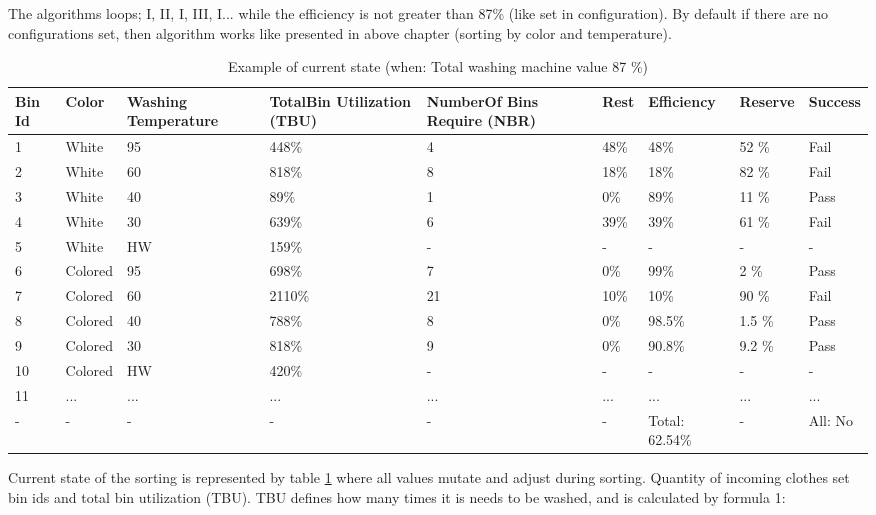 The algorithms loops;  I, II, I, III, I... while the efficiency is not greater than 87\% (like set in configuration). By default if there are no configurations set, then algorithm works like presented in above chapter (sorting by color and temperature).

\begin{table}[h]
	
    \begin{tabular}{ | p{0.4cm} | p{1cm} | p{2cm} | p{1.7cm} |p{2cm} |p{1cm} |p{1.3cm} |p{1.2cm} |p{1.3cm} |}
    \hline
	Bin Id & Color & Washing Temperature & TotalBin Utilization (TBU) & NumberOf Bins Require (NBR) & Rest & Efficiency & Reserve & Success\\ \hline
	1 & White & 95 & 448\% & 4 & 48\% & 48\% & 52 \% & Fail \\ \hline
	2 & White & 60 & 818\% & 8 & 18\% & 18\% & 82 \% & Fail \\ \hline
	3 & White & 40 & 89\% & 1 & 0\% & 89\% & 11 \% & Pass \\ \hline
	4 & White & 30 & 639\% & 6 & 39\% & 39\% & 61 \% & Fail \\ \hline
	5 & White & HW & 159\% & - & - & - & - & - \\ \hline
	6 & Colored & 95 & 698\% & 7 & 0\% & 99\% & 2 \% & Pass \\ \hline
	7 & Colored & 60 & 2110\% & 21 & 10\% & 10\% & 90 \% & Fail \\ \hline
	8 & Colored & 40 & 788\% & 8 & 0\% & 98.5\% & 1.5 \% & Pass \\ \hline
	9 & Colored & 30 & 818\% & 9 & 0\% & 90.8\% & 9.2 \% & Pass \\ \hline
	10 & Colored & HW & 420\% & - & - & - & - & - \\ \hline
	11 & ... & ... & ... & ... & ... & ... & ... & ... \\ \hline
	- & - & - & - & - & - & Total: 62.54\% & - & All: No \\ \hline
    \end{tabular}
	\caption{Example of current state (when: Total washing machine value 87 \%)}
	\label{tab:currentState}
\end{table}

\newpage

Current state of the sorting is represented by table \ref{tab:currentState} where all values mutate and adjust during sorting. Quantity of incoming clothes set bin ids and total bin utilization (TBU). TBU defines how many times it is needs to be washed, and is calculated by formula 1:


